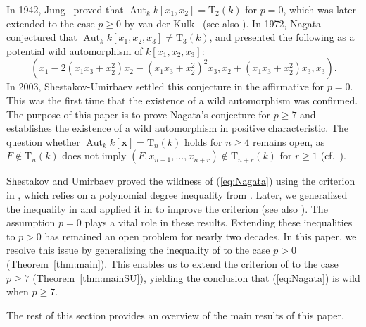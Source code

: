 \documentclass{amsart}
\theoremstyle{plain}
\theoremstyle{definition}
\newcommand{\Aut }{\mathop{\mathrm{Aut}}\nolimits}
\newcommand{\T }{\mathrm{T}}
\newcommand{\x}{{\boldsymbol x}}
\newcommand{\kx}{k[\x]}
\begin{document}
In 1942, 
Jung~\cite{Jung} proved that $\Aut _kk[x_1,x_2]=\T _2(k)$ for $p=0$, 
which was later extended to the case $p\ge 0$ by van der Kulk~\cite{Kulk} 
(see also \cite{Makar-Limanov}). 
In 1972, 
Nagata~\cite{Nagata} conjectured that 
$\Aut _kk[x_1,x_2,x_3]\ne \T _3(k)$, 
and presented the following 
as a potential wild automorphism of $k[x_1,x_2,x_3]$: 
\begin{equation}\label{eq:Nagata}
(x_1-2(x_1x_3+x_2^2)x_2-(x_1x_3+x_2^2)^2x_3,
x_2+(x_1x_3+x_2^2)x_3,
x_3). 
\end{equation}
In 2003, 
Shestakov-Umirbaev \cite{SUpoisson,SU} 
settled this 
conjecture in the affirmative for $p=0$. 
This was the first time that the existence of 
a wild automorphism was confirmed. 
The purpose of this paper is to prove 
Nagata's conjecture for $p\ge 7$ 
and establishes the existence of 
a wild automorphism in positive characteristic. 
The question whether 
$\Aut _k\kx =\T _n(k)$ holds for $n\ge 4$ remains open, 
as $F\not\in \T _n(k)$ does not imply 
$(F,x_{n+1},\ldots ,x_{n+r})\not\in \T _{n+r}(k)$ for $r\ge 1$ 
(cf.\ \cite{BEW,EH,Smith}). 



Shestakov and Umirbaev proved 
the wildness of (\ref{eq:Nagata}) using the criterion in \cite{SU}, 
which relies on 
a polynomial degree inequality from \cite{SUpoisson}. 
Later, we generalized the inequality in \cite{SUineq} 
and applied it in \cite{tame3} to improve the criterion 
(see also \cite[Chapter~1]{JC}). 
The assumption $p=0$ plays a vital role in these results. 
Extending these inequalities to $p>0$ 
has remained an open problem for nearly two decades. 
In this paper, 
we resolve this issue by generalizing the inequality of \cite{SUineq} 
to the case $p>0$ (Theorem~\ref{thm:main}). 
This enables us to extend 
the criterion of \cite{tame3} 
to the case $p\ge 7$ (Theorem~\ref{thm:mainSU}), 
yielding the conclusion that 
(\ref{eq:Nagata}) is wild when $p\ge 7$. 



The rest of this section provides 
an overview of the main results of this paper. 
\end{document}
